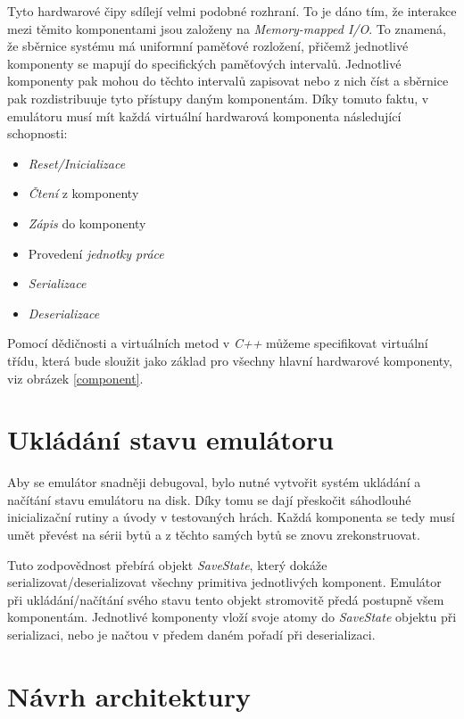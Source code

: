 Tyto hardwarové čipy sdílejí velmi podobné rozhraní. 
To je dáno tím, že interakce mezi těmito komponentami jsou založeny na \textit{Memory-mapped I/O}.
To znamená, že sběrnice systému má uniformní paměťové rozložení, přičemž jednotlivé komponenty se mapují do specifických paměťových intervalů. 
Jednotlivé komponenty pak mohou do těchto intervalů zapisovat nebo z nich číst a sběrnice pak rozdistribuuje tyto přístupy daným komponentám.
Díky tomuto faktu, v emulátoru musí mít každá virtuální hardwarová komponenta následující schopnosti:

\begin{itemize}
    \item{\textit{Reset/Inicializace}}
    \item{\textit{Čtení} z komponenty}
    \item{\textit{Zápis} do komponenty}
    \item{Provedení \textit{jednotky práce}}
    \item{\textit{Serializace}}
    \item{\textit{Deserializace}}
\end{itemize}

Pomocí dědičnosti a virtuálních metod v \textit{C++} můžeme specifikovat virtuální třídu, která bude sloužit jako základ pro všechny hlavní hardwarové komponenty, viz obrázek \ref{component}.

\section{Ukládání stavu emulátoru}

Aby se emulátor snadněji debugoval, bylo nutné vytvořit systém ukládání a načítání stavu emulátoru na disk.
Díky tomu se dají přeskočit sáhodlouhé inicializační rutiny a úvody v testovaných hrách.
Každá komponenta se tedy musí umět převést na sérii bytů a z těchto samých bytů se znovu zrekonstruovat.

Tuto zodpovědnost přebírá objekt \textit{SaveState}, který dokáže serializovat/deserializovat všechny primitiva
jednotlivých komponent.
Emulátor při ukládání/načítání svého stavu tento objekt stromovitě předá postupně všem komponentám. Jednotlivé komponenty vloží svoje atomy do \textit{SaveState} objektu při serializaci,
nebo je načtou v předem daném pořadí při deserializaci.

\section{Návrh architektury}


